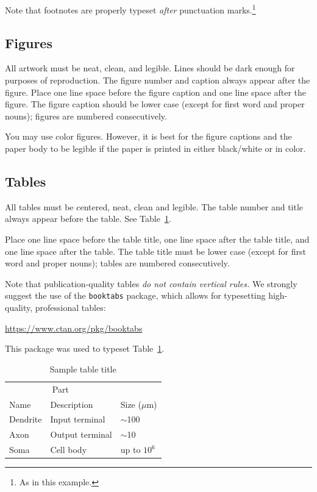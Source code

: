 \documentclass{article}
\begin{document}
Note that footnotes are properly typeset \emph{after} punctuation
marks.\footnote{As in this example.}


\subsection{Figures}


All artwork must be neat, clean, and legible. Lines should be dark enough for
purposes of reproduction. The figure number and caption always appear after the
figure. Place one line space before the figure caption and one line space after
the figure. The figure caption should be lower case (except for first word and
proper nouns); figures are numbered consecutively.


You may use color figures.  However, it is best for the figure captions and the
paper body to be legible if the paper is printed in either black/white or in
color.


\subsection{Tables}


All tables must be centered, neat, clean and legible.  The table number and
title always appear before the table.  See Table~\ref{sample-table}.


Place one line space before the table title, one line space after the
table title, and one line space after the table. The table title must
be lower case (except for first word and proper nouns); tables are
numbered consecutively.


Note that publication-quality tables \emph{do not contain vertical rules.} We
strongly suggest the use of the \verb+booktabs+ package, which allows for
typesetting high-quality, professional tables:
\begin{center}
  \url{https://www.ctan.org/pkg/booktabs}
\end{center}
This package was used to typeset Table~\ref{sample-table}.


\begin{table}
  \caption{Sample table title}
  \label{sample-table}
  \centering
  \begin{tabular}{lll}
    \toprule
    \multicolumn{2}{c}{Part}                   \\
    \cmidrule(r){1-2}
    Name     & Description     & Size ($\mu$m) \\
    \midrule
    Dendrite & Input terminal  & $\sim$100     \\
    Axon     & Output terminal & $\sim$10      \\
    Soma     & Cell body       & up to $10^6$  \\
    \bottomrule
  \end{tabular}
\end{table}
\end{document}
